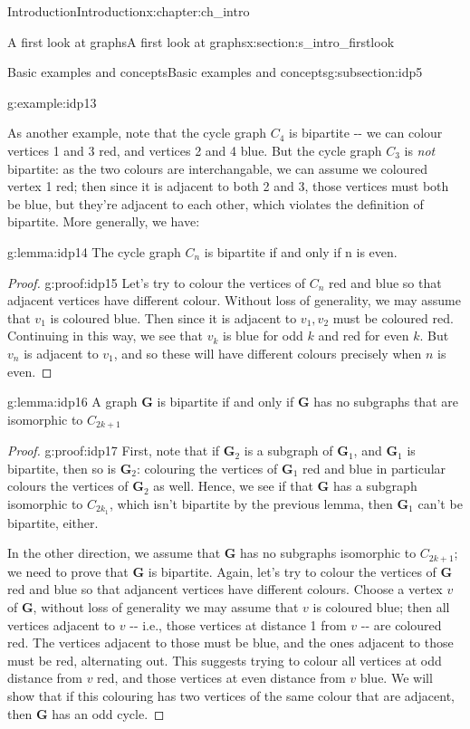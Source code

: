 \documentclass[oneside,10pt,]{book}
\numberwithin{equation}{section}
\newcommand{\bfG}{\mathbf{G}}
\begin{document}
\begin{chapterptx}{Introduction}{}{Introduction}{}{}{x:chapter:ch_intro}
\begin{sectionptx}{A first look at graphs}{}{A first look at graphs}{}{}{x:section:s_intro_firstlook}
\begin{subsectionptx}{Basic examples and concepts}{}{Basic examples and concepts}{}{}{g:subsection:idp5}
\begin{example}{}{g:example:idp13}
\begin{image}{0.05}{0.9}{0.05}
{\begin{tikzpicture}
\end{tikzpicture}
}%
\end{image}%
\end{example}
As another example, note that the cycle graph \(C_4\) is bipartite -{}-{} we can colour vertices 1 and 3 red, and vertices 2 and 4 blue.  But the cycle graph \(C_3\) is \emph{not} bipartite: as the two colours are interchangable, we can assume we coloured vertex 1 red; then since it is adjacent to both 2 and 3, those vertices must both be blue, but they're adjacent to each other, which violates the definition of bipartite.  More generally, we have:%
\begin{lemma}{}{}{g:lemma:idp14}%
The cycle graph \(C_n\) is bipartite if and only if n is even.%
\end{lemma}
\begin{proof}{}{g:proof:idp15}
Let's try to colour the vertices of \(C_n\) red and blue so that adjacent vertices have different colour.  Without loss of generality, we may assume that \(v_1\) is coloured blue.  Then since it is adjacent to \(v_1, v_2\) must be coloured red.  Continuing in this way, we see that \(v_k\) is blue for odd \(k\) and red for even \(k\).  But \(v_n\) is adjacent to \(v_1\), and so these will have different colours precisely when \(n\) is even.%
\end{proof}
\begin{lemma}{}{}{g:lemma:idp16}%
A graph \(\bfG\) is bipartite if and only if \(\bfG\) has no subgraphs that are isomorphic to \(C_{2k+1}\)%
\end{lemma}
\begin{proof}{}{g:proof:idp17}
First, note that if \(\bfG_2\) is a subgraph of \(\bfG_1\), and \(\bfG_1\) is bipartite, then so is \(\bfG_2\): colouring the vertices of \(\bfG_1\) red and blue in particular colours the vertices of \(\bfG_2\) as well.  Hence, we see if that \(\bfG\) has a subgraph isomorphic to \(C_{2k_1}\), which isn't bipartite by the previous lemma, then \(\bfG_1\) can't be bipartite, either.%
\par
In the other direction, we assume that \(\bfG\) has no subgraphs isomorphic to \(C_{2k+1}\); we need to prove that \(\bfG\) is bipartite.  Again, let's try to colour the vertices of \(\bfG\) red and blue so that adjancent vertices have different colours.  Choose a vertex \(v\) of \(\bfG\), without loss of generality we may assume that \(v\) is coloured blue; then all vertices adjacent to \(v\) -{}-{} i.e., those vertices at distance 1 from \(v\) -{}-{} are coloured red.  The vertices adjacent to those must be blue, and the ones adjacent to those must be red, alternating out.  This suggests trying to colour all vertices at odd distance from \(v\) red, and those vertices at even distance from \(v\) blue.  We will show that if this colouring has two vertices of the same colour that are adjacent, then \(\bfG\) has an odd cycle.%

\end{proof}
\end{subsectionptx}
\end{sectionptx}
\end{chapterptx}
\end{document}
